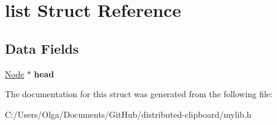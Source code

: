 \hypertarget{structlist}{}\section{list Struct Reference}
\label{structlist}
\subsection*{Data Fields}
\begin{DoxyCompactItemize}
\item 
\mbox{\label{structlist_aa3e81b47ac0637ebb1ea7cc12812405a}} 
\mbox{\hyperlink{structnode}{Node}} $\ast$ {\bfseries head}
\end{DoxyCompactItemize}


The documentation for this struct was generated from the following file\+:\begin{DoxyCompactItemize}
\item 
C\+:/\+Users/\+Olga/\+Documents/\+Git\+Hub/distributed-\/clipboard/mylib.\+h\end{DoxyCompactItemize}
